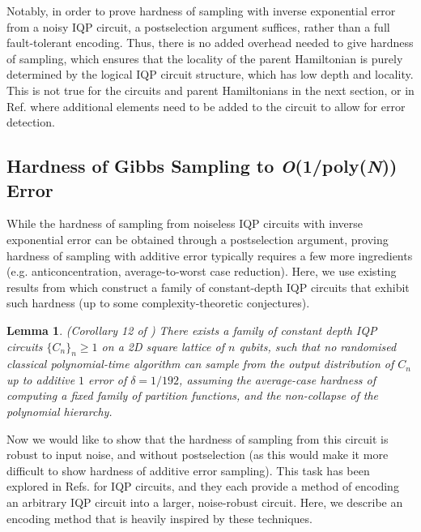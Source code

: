 \documentclass[a4paper,onecolumn,11pt,accepted=2017-05-09]{quantumarticle}
\newtheorem{lemma}[theorem]{Lemma}
\begin{document}
      Notably, in order to prove hardness of sampling with inverse exponential error from a noisy IQP circuit, a postselection argument suffices, rather than a full fault-tolerant encoding.  
      Thus, there is no added overhead needed to give hardness of sampling, which ensures that the locality of the parent Hamiltonian is purely determined by the logical IQP circuit structure, which has low depth and locality. This is not true for the circuits and parent Hamiltonians in the next section, or in Ref. \cite{bergamaschi2024sample} where additional elements need to be added to the circuit to allow for error detection. 
      

\subsection{Hardness of Gibbs Sampling to \textit{O}(1/poly(\textit{N})) Error}
\label{Sec:Hardness_Polynomial}

 While the hardness of sampling from noiseless IQP circuits with inverse exponential error can be obtained through a postselection argument, proving hardness of sampling with additive error typically requires a few more ingredients (e.g. anticoncentration, average-to-worst case reduction). Here, we use existing results from \citeauthor{Hangleiter_2018} \cite{Hangleiter_2018} which construct a family of constant-depth IQP circuits that exhibit such hardness (up to some complexity-theoretic conjectures).
\begin{lemma} (Corollary 12 of \cite{Hangleiter_2018}) \label{Lemma:HangleiterCircuit}
There exists a family of constant depth IQP circuits $\{C_n\}_n\geq 1$ on a 2D square lattice of $n$ qubits, such that no randomised classical polynomial-time algorithm can sample from the output distribution of $C_n$ up to additive $1$ error of $\delta=1/192$, assuming the average-case hardness of computing a fixed family of partition functions, and the non-collapse of the polynomial hierarchy.
\end{lemma}    

Now we would like to show that the hardness of sampling from this circuit is robust to input noise, and without postselection (as this would make it more difficult to show hardness of additive error sampling). 
This task has been explored in Refs. \cite{Bremner_2017, bergamaschi2024sample} for IQP circuits, and they each provide a method of encoding an arbitrary IQP circuit into a larger, noise-robust circuit. 
Here, we describe an encoding method that is heavily inspired by these techniques.
%
\end{document}
